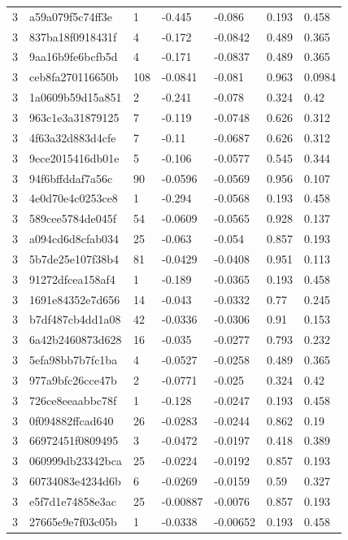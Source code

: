 \begin{tabular}{lllllll}
3 & a59a079f5c74ff3e & 1 & -0.445 & -0.086 & 0.193 & 0.458 \\
3 & 837ba18f0918431f & 4 & -0.172 & -0.0842 & 0.489 & 0.365 \\
3 & 9aa16b9fe6bcfb5d & 4 & -0.171 & -0.0837 & 0.489 & 0.365 \\
3 & ceb8fa270116650b & 108 & -0.0841 & -0.081 & 0.963 & 0.0984 \\
3 & 1a0609b59d15a851 & 2 & -0.241 & -0.078 & 0.324 & 0.42 \\
3 & 963c1e3a31879125 & 7 & -0.119 & -0.0748 & 0.626 & 0.312 \\
3 & 4f63a32d883d4cfe & 7 & -0.11 & -0.0687 & 0.626 & 0.312 \\
3 & 9ece2015416db01e & 5 & -0.106 & -0.0577 & 0.545 & 0.344 \\
3 & 94f6bffddaf7a56c & 90 & -0.0596 & -0.0569 & 0.956 & 0.107 \\
3 & 4e0d70e4c0253ce8 & 1 & -0.294 & -0.0568 & 0.193 & 0.458 \\
3 & 589cee5784de045f & 54 & -0.0609 & -0.0565 & 0.928 & 0.137 \\
3 & a094cd6d8cfab034 & 25 & -0.063 & -0.054 & 0.857 & 0.193 \\
3 & 5b7de25e107f38b4 & 81 & -0.0429 & -0.0408 & 0.951 & 0.113 \\
3 & 91272dfcea158af4 & 1 & -0.189 & -0.0365 & 0.193 & 0.458 \\
3 & 1691e84352e7d656 & 14 & -0.043 & -0.0332 & 0.77 & 0.245 \\
3 & b7df487cb4dd1a08 & 42 & -0.0336 & -0.0306 & 0.91 & 0.153 \\
3 & 6a42b2460873d628 & 16 & -0.035 & -0.0277 & 0.793 & 0.232 \\
3 & 5efa98bb7b7fc1ba & 4 & -0.0527 & -0.0258 & 0.489 & 0.365 \\
3 & 977a9bfc26cce47b & 2 & -0.0771 & -0.025 & 0.324 & 0.42 \\
3 & 726ce8eeaabbc78f & 1 & -0.128 & -0.0247 & 0.193 & 0.458 \\
3 & 0f094882ffcad640 & 26 & -0.0283 & -0.0244 & 0.862 & 0.19 \\
3 & 66972451f0809495 & 3 & -0.0472 & -0.0197 & 0.418 & 0.389 \\
3 & 060999db23342bca & 25 & -0.0224 & -0.0192 & 0.857 & 0.193 \\
3 & 60734083e4234d6b & 6 & -0.0269 & -0.0159 & 0.59 & 0.327 \\
3 & e5f7d1e74858e3ac & 25 & -0.00887 & -0.0076 & 0.857 & 0.193 \\
3 & 27665e9e7f03c05b & 1 & -0.0338 & -0.00652 & 0.193 & 0.458 \\

\end{tabular}
